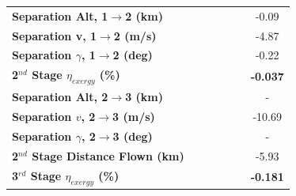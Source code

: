 \begin{table}[ht!]
\begin{tabular}{l c c c c c c}
		\textbf{Separation Alt, 1$\rightarrow$2 (km)}
		& \firstsecondSeparationAltCdNinetyNoReturn
		& \firstsecondSeparationAltCdNinetyFiveNoReturn
		& \firstsecondSeparationAltCdStandardNoReturn
		& \firstsecondSeparationAltCdOneHundredFiveNoReturn
		& \firstsecondSeparationAltCdOneHundredTenNoReturn
		&-0.09
		\\
		\textbf{Separation v, 1$\rightarrow$2 (m/s)}
		& \firstsecondSeparationvCdNinetyNoReturn
		& \firstsecondSeparationvCdNinetyFiveNoReturn
		& \firstsecondSeparationvCdStandardNoReturn
		& \firstsecondSeparationvCdOneHundredFiveNoReturn
		& \firstsecondSeparationvCdOneHundredTenNoReturn
		&-4.87
		\\
		\textbf{Separation $\gamma$, 1$\rightarrow$2 (deg)}
		& \firstsecondSeparationgammaCdNinetyNoReturn
		& \firstsecondSeparationgammaCdNinetyFiveNoReturn
		& \firstsecondSeparationgammaCdStandardNoReturn
		& \firstsecondSeparationgammaCdOneHundredFiveNoReturn
		& \firstsecondSeparationgammaCdOneHundredTenNoReturn
		&-0.22
		\\
		\hline 
		\textbf{2$^{nd}$ Stage $\eta_{exergy}$ (\%)}
		& \textbf{\secondExergyEffCdNinetyNoReturn}
		& \textbf{\secondExergyEffCdNinetyFiveNoReturn}
		& \textbf{\secondExergyEffCdStandardNoReturn}
		& \textbf{\secondExergyEffCdOneHundredFiveNoReturn}
		& \textbf{\secondExergyEffCdOneHundredTenNoReturn}
		& \textbf{-0.037}
		\\
	
		\textbf{Separation Alt, 2$\rightarrow$3 (km)}
		& \secondthirdSeparationAltCdNinetyNoReturn
		& \secondthirdSeparationAltCdNinetyFiveNoReturn
		& \secondthirdSeparationAltCdStandardNoReturn
		& \secondthirdSeparationAltCdOneHundredFiveNoReturn
		& \secondthirdSeparationAltCdOneHundredTenNoReturn
		& -
		\\
		\textbf{Separation $v$, 2$\rightarrow$3 (m/s)}
		& \secondthirdSeparationvCdNinetyNoReturn
		& \secondthirdSeparationvCdNinetyFiveNoReturn
		& \secondthirdSeparationvCdStandardNoReturn
		& \secondthirdSeparationvCdOneHundredFiveNoReturn
		& \secondthirdSeparationvCdOneHundredTenNoReturn
		&-10.69
		\\
		\textbf{Separation $\gamma$, 2$\rightarrow$3 (deg)}
		& \secondthirdSeparationgammaCdNinetyNoReturn
		& \secondthirdSeparationgammaCdNinetyFiveNoReturn
		& \secondthirdSeparationgammaCdStandardNoReturn
		& \secondthirdSeparationgammaCdOneHundredFiveNoReturn
		& \secondthirdSeparationgammaCdOneHundredTenNoReturn
		& -
		\\

		\textbf{2$^{nd}$ Stage Distance Flown (km)}
		& \SecondDistCdNinetyNoReturn
		& \SecondDistCdNinetyFiveNoReturn
		& \SecondDistCdStandardNoReturn
		& \SecondDistCdOneHundredFiveNoReturn
		& \SecondDistCdOneHundredTenNoReturn
		&-5.93
		\\
		\hline 
		\textbf{3$^{rd}$ Stage $\eta_{exergy}$ (\%)}
		& \textbf{\thirddExergyEffCdNinetyNoReturn}
		& \textbf{\thirddExergyEffCdNinetyFiveNoReturn}
		& \textbf{\thirddExergyEffCdStandardNoReturn}
		& \textbf{\thirddExergyEffCdOneHundredFiveNoReturn}
		& \textbf{\thirddExergyEffCdOneHundredTenNoReturn}
		& \textbf{-0.181}
		\\


\end{tabular}
\end{table}
